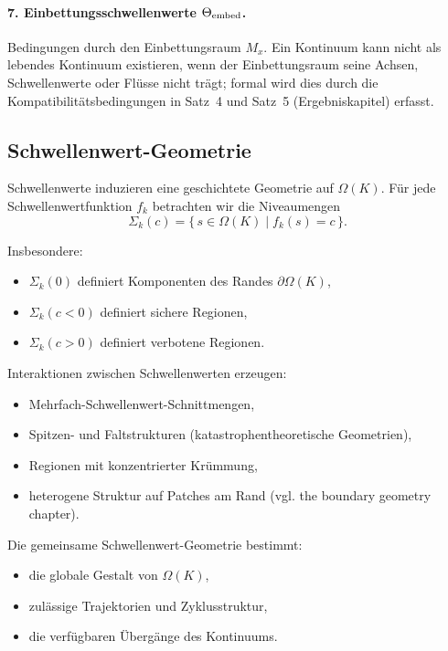 \paragraph{7. Einbettungsschwellenwerte \(\Theta_{\rm embed}\).}
Bedingungen durch den Einbettungsraum \(M_x\).
Ein Kontinuum kann nicht als lebendes Kontinuum existieren, wenn der Einbettungsraum
seine Achsen, Schwellenwerte oder Flüsse nicht trägt; formal wird dies durch die
Kompatibilitätsbedingungen in Satz~4 und Satz~5 (Ergebniskapitel) erfasst.

\subsection{Schwellenwert-Geometrie}

Schwellenwerte induzieren eine geschichtete Geometrie auf \(\Omega(K)\).
Für jede Schwellenwertfunktion \(f_k\) betrachten wir die Niveaumengen
\[
  \Sigma_k(c) = \{\, s \in \Omega(K) \mid f_k(s) = c \,\}.
\]

Insbesondere:
\begin{itemize}
    \item \(\Sigma_k(0)\) definiert Komponenten des Randes \(\partial\Omega(K)\),
    \item \(\Sigma_k(c<0)\) definiert sichere Regionen,
    \item \(\Sigma_k(c>0)\) definiert verbotene Regionen.
\end{itemize}

Interaktionen zwischen Schwellenwerten erzeugen:
\begin{itemize}
    \item Mehrfach-Schwellenwert-Schnittmengen,
    \item Spitzen- und Faltstrukturen (katastrophentheoretische Geometrien),
    \item Regionen mit konzentrierter Krümmung,
    \item heterogene Struktur auf Patches am Rand
          (vgl. the boundary geometry chapter).
\end{itemize}

Die gemeinsame Schwellenwert-Geometrie bestimmt:
\begin{itemize}
    \item die globale Gestalt von \(\Omega(K)\),
    \item zulässige Trajektorien und Zyklusstruktur,
    \item die verfügbaren Übergänge des Kontinuums.
\end{itemize}


